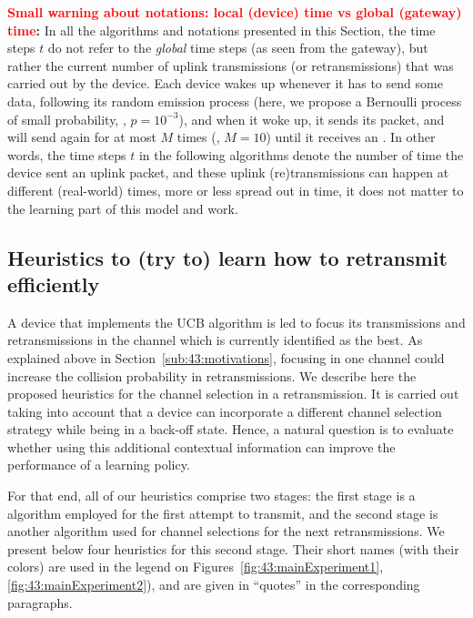 \begin{leftbar}[warningbar]  %
	\textbf{\textcolor{red}{Small warning about notations: local (device) time vs global (gateway) time}:}
	In all the algorithms and notations presented in this Section, the time steps $t$ do not refer to the \emph{global} time steps (as seen from the gateway), but rather the current number of uplink transmissions (or retransmissions) that was carried out by the device.
	Each device wakes up whenever it has to send some data, following its random emission process (here, we propose a Bernoulli process of small probability, \eg, $p=10^{-3}$), and when it woke up, it sends its packet, and will send again for at most $M$ times (\eg, $M=10$) until it receives an \Ack.
	In other words, the time steps $t$ in the following algorithms denote the number of time the device sent an uplink packet, and these uplink (re)transmissions can happen at different (real-world) times, more or less spread out in time, it does not matter to the learning part of this model and work.
\end{leftbar}  %


\subsection{Heuristics to (try to) learn how to retransmit efficiently}
\label{sub:43:heuristics}

A device that implements the UCB algorithm is led to focus its transmissions and retransmissions in the channel which is currently identified as the best.
As explained above in Section~\ref{sub:43:motivations}, focusing in one channel could increase the collision probability in retransmissions.
We describe here the proposed heuristics for the channel selection in a retransmission. It is carried out taking into account that a device can incorporate a different channel selection strategy while being in a back-off state.
Hence, a natural question is to evaluate whether using this additional contextual information can improve the performance of a learning policy.

For that end, all of our heuristics comprise two stages:
the first stage is a \UCB{} algorithm employed for the first attempt to transmit,
and the second stage is another algorithm used for channel selections for the next retransmissions.
%
We present below four heuristics for this second stage.
Their short names (with their colors) are used in the legend on Figures~\ref{fig:43:mainExperiment1}, \ref{fig:43:mainExperiment2}), and are given in ``quotes'' in the corresponding paragraphs.


